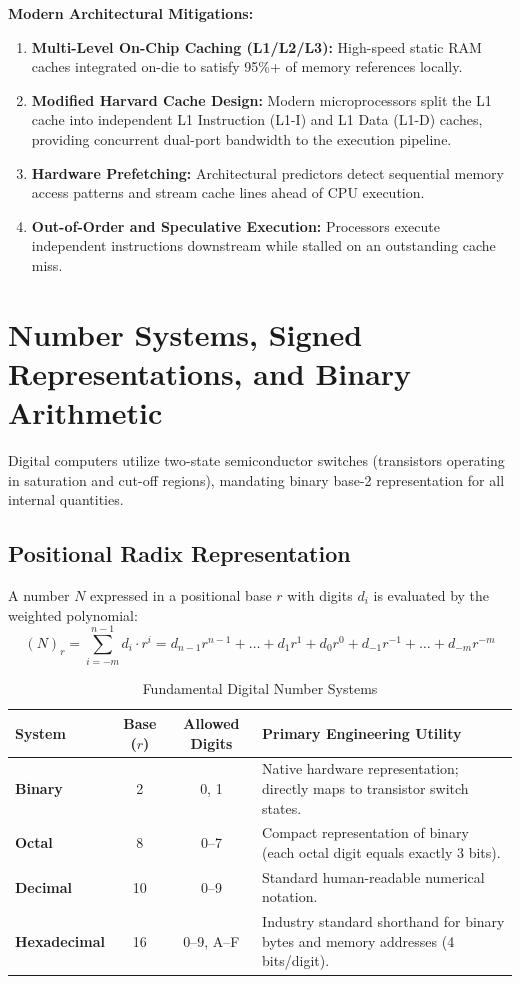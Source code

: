 \textbf{Modern Architectural Mitigations:}
\begin{enumerate}[label=\bfseries\arabic*.]
    \item \textbf{Multi-Level On-Chip Caching (L1/L2/L3):} High-speed static RAM caches integrated on-die to satisfy 95\%+ of memory references locally.
    \item \textbf{Modified Harvard Cache Design:} Modern microprocessors split the L1 cache into independent L1 Instruction (L1-I) and L1 Data (L1-D) caches, providing concurrent dual-port bandwidth to the execution pipeline.
    \item \textbf{Hardware Prefetching:} Architectural predictors detect sequential memory access patterns and stream cache lines ahead of CPU execution.
    \item \textbf{Out-of-Order and Speculative Execution:} Processors execute independent instructions downstream while stalled on an outstanding cache miss.
\end{enumerate}


\section{Number Systems, Signed Representations, and Binary Arithmetic}
\label{sec:number_systems}

Digital computers utilize two-state semiconductor switches (transistors operating in saturation and cut-off regions), mandating binary base-2 representation for all internal quantities.

\subsection{Positional Radix Representation}
A number $N$ expressed in a positional base $r$ with digits $d_i$ is evaluated by the weighted polynomial:
\begin{equation}
\label{eq:radix_polynomial}
(N)_r = \sum_{i=-m}^{n-1} d_i \cdot r^i = d_{n-1} r^{n-1} + \dots + d_1 r^1 + d_0 r^0 + d_{-1} r^{-1} + \dots + d_{-m} r^{-m}
\end{equation}

\begin{table}[htbp]
\centering
\small
\caption{Fundamental Digital Number Systems}
\label{tab:number_systems}
\begin{tabularx}{\textwidth}{l c c X}
\toprule
\textbf{System} & \textbf{Base ($r$)} & \textbf{Allowed Digits} & \textbf{Primary Engineering Utility} \\
\midrule
\textbf{Binary} & 2 & 0, 1 & Native hardware representation; directly maps to transistor switch states. \\
\textbf{Octal} & 8 & 0--7 & Compact representation of binary (each octal digit equals exactly 3 bits). \\
\textbf{Decimal} & 10 & 0--9 & Standard human-readable numerical notation. \\
\textbf{Hexadecimal} & 16 & 0--9, A--F & Industry standard shorthand for binary bytes and memory addresses (4 bits/digit). \\
\bottomrule
\end{tabularx}
\end{table}

